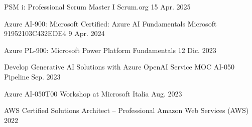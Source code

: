 

\begin{cvhonors}

  \cvhonor
  {PSM i: Professional Scrum Master I} %
  {Scrum.org} %
  {} %
  {15 Apr. 2025} %

  \cvhonor
    {Azure AI-900: Microsoft Certified: Azure AI Fundamentals} %
    {Microsoft} %
    {91952103C432EDE4} %
    {9 Apr. 2024} %

  \cvhonor
    {Azure PL-900: Microsoft Power Platform Fundamentals} %
    {} %
    {} %
    {12 Dic. 2023} %

  \cvhonor
    {Develop Generative AI Solutions with Azure OpenAI Service MOC AI-050} %
    {Pipeline} %
    {} %
    {Sep. 2023} %

  \cvhonor
    {Azure AI-050T00} %
    {Workshop at Microsoft Italia} %
    {} %
    {Aug. 2023} %

  \cvhonor
    {AWS Certified Solutions Architect – Professional} %
    {Amazon Web Services (AWS)} %
    {} %
    {2022} %


\end{cvhonors}
